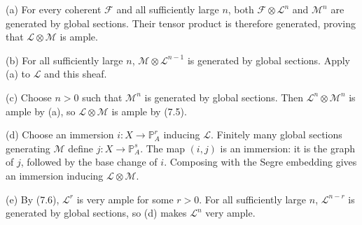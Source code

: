 (a) For every coherent $\mathcal F$ and all sufficiently large $n$, both $\mathcal F\otimes\mathcal L^n$ and $\mathcal M^n$ are generated by global sections. Their tensor product is therefore generated, proving that $\mathcal L\otimes\mathcal M$ is ample.

(b) For all sufficiently large $n$, $\mathcal M\otimes\mathcal L^{n-1}$ is generated by global sections. Apply (a) to $\mathcal L$ and this sheaf.

(c) Choose $n>0$ such that $\mathcal M^n$ is generated by global sections. Then $\mathcal L^n\otimes\mathcal M^n$ is ample by (a), so $\mathcal L\otimes\mathcal M$ is ample by (7.5).

(d) Choose an immersion $i:X\to\mathbb P_A^r$ inducing $\mathcal L$. Finitely many global sections generating $\mathcal M$ define $j:X\to\mathbb P_A^s$. The map $(i,j)$ is an immersion: it is the graph of $j$, followed by the base change of $i$. Composing with the Segre embedding gives an immersion inducing $\mathcal L\otimes\mathcal M$.

(e) By (7.6), $\mathcal L^r$ is very ample for some $r>0$. For all sufficiently large $n$, $\mathcal L^{n-r}$ is generated by global sections, so (d) makes $\mathcal L^n$ very ample.
